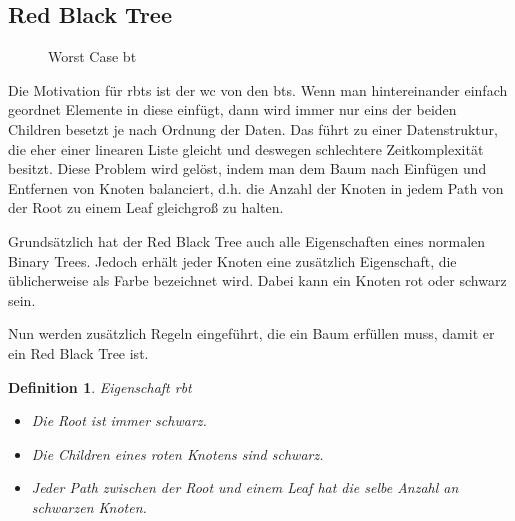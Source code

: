\documentclass[11pt]{article}
\newtheorem{definition}{Definition}
\begin{document}
\subsection{Red Black Tree}

\begin{figure}
  \centering
\caption{Worst Case \gls{bt}}
\vspace{-50pt}
\end{figure}

Die Motivation für \glspl{rbt} ist der \gls{wc} von den \glspl{bt}. 
Wenn man hintereinander einfach geordnet Elemente in diese einfügt, dann wird immer nur eins der beiden Children besetzt je nach Ordnung der Daten.
Das führt zu einer Datenstruktur, die eher einer linearen Liste gleicht und deswegen schlechtere Zeitkomplexität besitzt. Diese Problem wird gelöst, indem man dem Baum nach Einfügen und Entfernen von Knoten balanciert,
d.h. die Anzahl der Knoten in jedem Path von der Root zu einem Leaf gleichgroß zu halten.

Grundsätzlich hat der Red Black Tree auch alle Eigenschaften eines normalen Binary Trees. Jedoch erhält jeder Knoten eine zusätzlich Eigenschaft, die üblicherweise als Farbe bezeichnet wird.
Dabei kann ein Knoten rot oder schwarz sein.

Nun werden zusätzlich Regeln eingeführt, die ein Baum erfüllen muss, damit er ein Red Black Tree ist.

\begin{definition}{Eigenschaft \gls{rbt}}
  
\begin{itemize}
  \item[1.] Die Root ist immer schwarz.
  \item[2.] Die Children eines roten Knotens sind schwarz.
  \item[3.] Jeder Path zwischen der Root und einem Leaf hat die selbe Anzahl an schwarzen Knoten. 
\end{itemize}

\end{definition}
\end{document}
